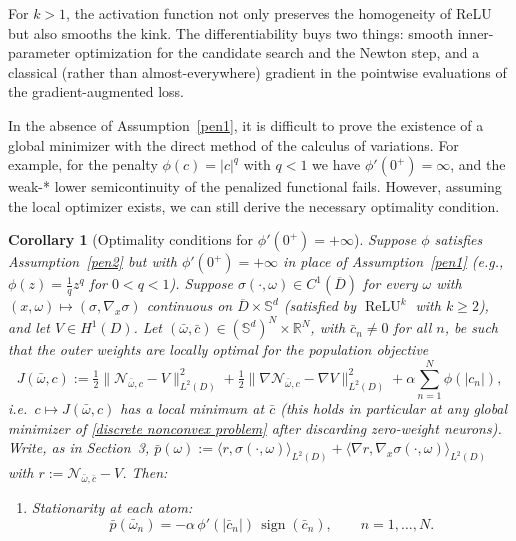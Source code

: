 \documentclass[11pt]{amsart}
\newtheorem{corollary}[theorem]{Corollary}
\theoremstyle{definition}
\theoremstyle{remark}
\DeclareMathOperator{\sign}{sign}
\DeclareMathOperator{\relu}{ReLU}
\newcommand{\reluk}{\relu^{k}}
\begin{document}
For $k > 1$, the activation function not only preserves the homogeneity of ReLU but also smooths the kink. The differentiability buys two things: smooth inner-parameter optimization for the candidate search and the Newton step, and a classical (rather than almost-everywhere) gradient in the pointwise evaluations of the gradient-augmented loss.

In the absence of Assumption~\ref{pen1}, it is difficult to prove the existence of a global minimizer with the direct method of the calculus of variations.
For example, for the penalty $\phi(c) = |c|^q$ with $q < 1$ we have $\phi'(0^+) = \infty$, and the weak-* lower semicontinuity of the penalized functional fails.
However, assuming the local optimizer exists, we can still derive the necessary optimality condition. 

\begin{corollary}[Optimality conditions for $\phi'(0^+) = +\infty$]
\label{cor:singular_penalty}
Suppose $\phi$ satisfies Assumption~\ref{pen2} but with $\phi'(0^+) = +\infty$
in place of Assumption~\ref{pen1}
(e.g., $\phi(z) = \frac{1}{q}z^q$ for $0 < q < 1$).
Suppose $\sigma(\cdot, \omega) \in C^1(\overline{D})$ for every $\omega$ with
$(x, \omega) \mapsto (\sigma, \nabla_x \sigma)$ continuous on
$\overline{D} \times \mathbb{S}^d$ (satisfied by $\reluk$ with $k \ge 2$), and
let $V \in H^1(D)$.
Let $(\bar{\omega}, \bar{c}) \in (\mathbb{S}^d)^N \times \mathbb{R}^N$, with
$\bar{c}_n \neq 0$ for all $n$, be such that the outer weights are locally
optimal for the population objective
\begin{equation*}
	J(\bar{\omega}, c) := \tfrac{1}{2} \|\mathcal{N}_{\bar{\omega}, c} - V\|_{L^2(D)}^2
	+ \tfrac{1}{2} \|\nabla \mathcal{N}_{\bar{\omega}, c} - \nabla V\|_{L^2(D)}^2
	+ \alpha \sum_{n=1}^N \phi(|c_n|),
\end{equation*}
i.e.\ $c \mapsto J(\bar{\omega}, c)$ has a local minimum at $\bar{c}$ (this
holds in particular at any global minimizer of
\eqref{discrete nonconvex problem} after discarding zero-weight neurons).
Write, as in Section~3,
$\bar{p}(\omega) := \langle r, \sigma(\cdot, \omega)\rangle_{L^2(D)}
+ \langle \nabla r, \nabla_x \sigma(\cdot, \omega)\rangle_{L^2(D)}$
with $r := \mathcal{N}_{\bar{\omega}, \bar{c}} - V$. Then:
\begin{enumerate}
	\item Stationarity at each atom:
	\begin{equation*}
		\bar{p}(\bar{\omega}_n) = -\alpha\,\phi'(|\bar{c}_n|)\,\sign(\bar{c}_n),
		\qquad n = 1, \dots, N.

\end{equation*}
\end{enumerate}
\end{corollary}
\end{document}
